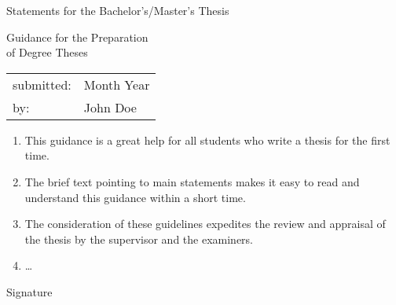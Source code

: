 %
%

\begin{center}
	\Large
	Statements for the Bachelor's/Master's Thesis
\end{center}

\begin{center}
	\large
	Guidance for the Preparation \\
	of Degree Theses
\end{center}
\normalsize

\bigskip

\begin{tabular}{ll}
	submitted: & Month Year \\
	by: & John Doe
\end{tabular}

\bigskip

\begin{enumerate}
	\item This guidance is a great help for all students who write a thesis for the first time.
	\item The brief text pointing to main statements makes it easy to read and understand this guidance within a short time. 
	\item The consideration of these guidelines expedites the review and appraisal of the thesis by the supervisor and the examiners.
	\item \ldots
\end{enumerate}

\vfill
	
\begin{flushright}
	Signature
\end{flushright}

